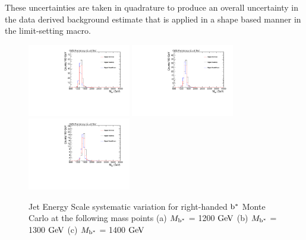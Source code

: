 These uncertainties are
taken in quadrature to produce an overall uncertainty in the data
derived background estimate that is applied in a shape based manner in
the limit-setting macro. 

\begin{figure}[htcb]
\begin{center}
\includegraphics[width=0.4\textwidth]{AN-14-049/figs/Signal_M1200_PtScaling}
\includegraphics[width=0.4\textwidth]{AN-14-049/figs/Signal_M1300_PtScaling}
\includegraphics[width=0.4\textwidth]{AN-14-049/figs/Signal_M1400_PtScaling}
\caption{
Jet Energy Scale systematic variation for right-handed $\mathrm{b}^{*}$  Monte Carlo at the following mass points
(a) $M_{\mathrm{b}^{*}}$ = 1200$~\mathrm{GeV}$ 
(b) $M_{\mathrm{b}^{*}}$ = 1300$~\mathrm{GeV}$
(c) $M_{\mathrm{b}^{*}}$ = 1400$~\mathrm{GeV}$ 
}
\label{figs:bssignalJES}
\end{center}
\end{figure}

